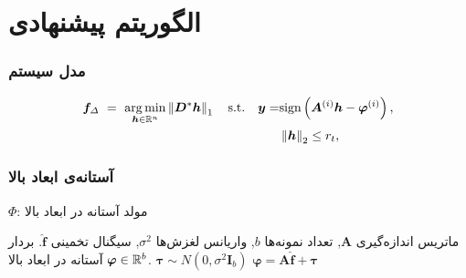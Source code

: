 \section{الگوریتم پیشنهادی\hfill}
\begin{frame}
\frametitle{مدل سیستم}
\begin{figure}
	\centering
	
\end{figure}

\begin{block}{}
\begin{align*}
\label{eq:SSR}
 \bm{f}_{\varDelta}~=~\mathop{\arg\min}_{\bm{h}\in \mathbb{R}^{n} } \left\lVert\bm{D}^{*}\bm{h}\right\rVert_{1}\quad \text{s.t.} \quad   \bm{y} =& \text{sign}\left(\bm{A}^{(i)}\bm{h}-\bm{\varphi}^{(i)} \right), \\
  & \left\lVert\bm{h}\right\rVert_{2}\leq  r_t,
\end{align*}
\end{block}

\end{frame}
\begin{frame}
\frametitle{آستانه‌ی ابعاد بالا}
\begin{algorithm}[H]
	\caption{$ \Phi $: مولد آستانه در ابعاد بالا}
	\label{alg:HDTG}
	\begin{algorithmic}[1]
		\renewcommand{\algorithmicrequire}{\textbf{ورودی:}}
		\renewcommand{\algorithmicensure}{\textbf{خروجی:}}
		\REQUIRE ماتریس اندازه‌گیری $ \bm{A} $, تعداد نمونه‌ها $ b $, واریانس لغزش‌ها $ \sigma^{2} $, سیگنال تخمینی $ \hat{\bm{f}} $.
		\ENSURE بردار آستانه در ابعاد بالا $\bm{\varphi}\in \mathbb{R}^{b}$.
		\STATE $ \bm{\tau}\sim N(0,\sigma^{2}\bm{I}_{b} ) $
		\STATE  $ \bm{\varphi}=\bm{A}\hat{\bm{f}}+\bm{\tau} $
	\end{algorithmic} 
\end{algorithm}
\end{frame}
